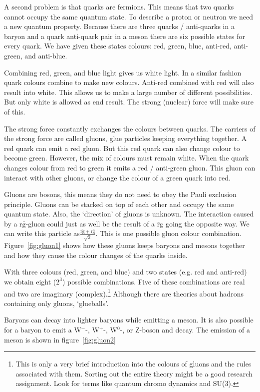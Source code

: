 A second problem is that quarks are fermions. This means that two quarks cannot occupy the same quantum state. To describe a proton or neutron we need a new quantum property. Because there are three quarks / anti-quarks in a baryon and a quark anti-quark pair in a meson there are six possible states for every quark. We have given these states colours: red, green, blue, anti-red, anti-green, and anti-blue.

Combining red, green, and blue light gives us white light. In a similar fashion quark colours combine to make new colours. Anti-red combined with red will also result into white. This allows us to make a large number of different possibilities. But only white is allowed as end result. The strong (nuclear) force will make sure of this.

The strong force constantly exchanges the colours between quarks. The carriers of the strong force are called gluons, glue particles keeping everything together. A red quark can emit a red gluon. But this red quark can also change colour to become green. However, the mix of colours must remain white. When the quark changes colour from red to green it emits a red / anti-green gluon. This gluon can interact with other gluons, or change the colour of a green quark into red.

Gluons are bosons, this means they do not need to obey the Pauli exclusion principle. Gluons can be stacked on top of each other and occupy the same quantum state. Also, the `direction' of gluons is unknown. The interaction caused by a r$\bar{\mbox{g}}$-gluon could just as well be the result of a $\bar{\mbox{r}}$g going the opposite way. We can write this particle as$\frac{\bar{\mbox{rg}}+\mbox{r}\bar{\mbox{g}}}{\sqrt{2}}$. This is one possible gluon colour combination. Figure~\ref{fig:gluon1} shows how these gluons keeps baryons and mesons together and how they cause the colour changes of the quarks inside.

With three colours (red, green, and blue) and two states (e.g. red and anti-red) we obtain eight ($2^3$) possible combinations. Five of these combinations are real and two are imaginary (complex).\footnote{This is only a very brief introduction into the colours of gluons and the rules associated with them. Sorting out the entire theory might be a good research assignment. Look for terms like quantum chromo dynamics and SU(3).} Although there are theories about hadrons containing only gluons, `glueballs'.

Baryons can decay into lighter baryons while emitting a meson. It is also possible for a baryon to emit a W$^-$-, W$^+$-, W$^0$-, or Z-boson and decay. The emission of a meson is shown in figure~\ref{fig:gluon2}

